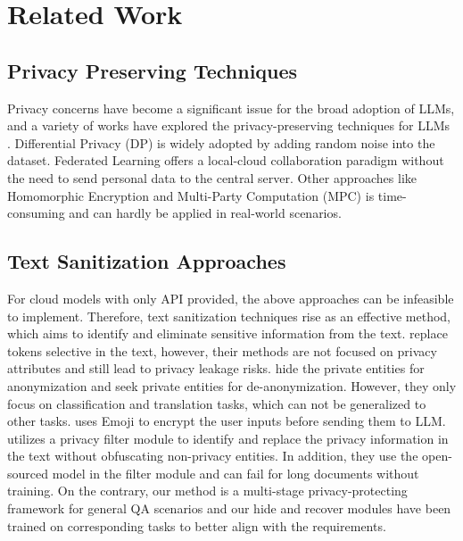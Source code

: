 \section{Related Work}
\label{sec:related work}
\subsection{Privacy Preserving Techniques}
Privacy concerns have become a significant issue for the broad adoption of LLMs, and a variety of works have explored the privacy-preserving techniques for LLMs \cite{yan2024protectingdataprivacylarge, edemacu2024privacypreservingpromptengineering}.
Differential Privacy (DP) \cite{InferDPT, utpala-etal-2023-locally, tang2024privacypreservingincontextlearningdifferentially, duan2023flocksstochasticparrotsdifferentially} is widely adopted by adding random noise into the dataset.
Federated Learning \cite{chen2023federatedlargelanguagemodel, yu2024federatedfoundationmodelsprivacypreserving, zhang2024buildingfederatedgptfederated} offers a local-cloud collaboration paradigm without the need to send personal data to the central server.
Other approaches like Homomorphic Encryption \cite{chen2022thexprivacypreservingtransformerinference, hao2022iron} and Multi-Party Computation (MPC) \cite{goldreich1998secure, dong2023pumasecureinferencellama7b} is time-consuming and can hardly be applied in real-world scenarios.

\subsection{Text Sanitization Approaches}

For cloud models with only API provided, the above approaches can be infeasible to implement.
Therefore, text sanitization techniques rise as an effective method, which aims to identify and eliminate sensitive information from the text.
\cite{CusText, SanText, InferDPT} replace tokens selective in the text, however, their methods are not focused on privacy attributes and still lead to privacy leakage risks.
\cite{HAS} hide the private entities for anonymization and seek private entities for de-anonymization. However, they only focus on classification and translation tasks, which can not be generalized to other tasks.
\cite{lin2024emojicryptpromptencryptionsecure} uses Emoji to encrypt the user
inputs before sending them to LLM.
\cite{kan2023protecting} utilizes a privacy filter module to identify and replace the privacy information in the text without obfuscating non-privacy entities. In addition, they use the open-sourced model in the filter module and can fail for long documents without training.
On the contrary, our method is a multi-stage privacy-protecting framework for general QA scenarios and our hide and recover modules have been trained on corresponding tasks to better align with the requirements.